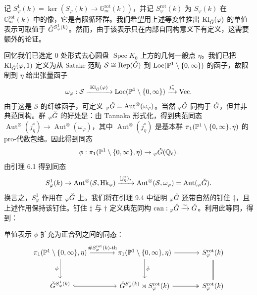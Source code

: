 记 $S^1_\varphi(k)=\ker(S_\varphi(k)\to\mathbb{G}_m^{\mathrm{rot}}(k))$，并记 $S^{\mathrm{rot}}_\varphi(k)$ 为 $S_\varphi(k)$ 在 $\mathbb{G}_m^{\mathrm{rot}}(k)$ 中的像，它是有限循环群。我们希望用上述等变性推出 $\mathrm{Kl}_{\check G}(\varphi)$ 的单值表示可取值于 $\check G^{S^1_\varphi(k)}$。然而，由于该表示只在内部自同构意义下有定义，这需要额外的论证。

回忆我们已选定 $0$ 处形式去心圆盘 $\operatorname{Spec}K_0$ 上方的几何一般点 $\eta$。我们已把 $\mathrm{Kl}_{\check G}(\varphi,1)$ 定义为从 Satake 范畴 $\mathcal S\cong\mathrm{Rep}(\check G)$ 到 $\mathrm{Loc}(\mathbb{P}^1\setminus\{0,\infty\})$ 的函子，故限制到 $\eta$ 给出张量函子
\begin{equation}
\omega_\varphi:\mathcal S\xrightarrow{\ \Kl_{\ckG}(\varphi)\ }\Loc(\PP^1\setminus\{0,\infty\})\xrightarrow{j_\eta^*}\Vec.
\end{equation}
由于这是 $\mathcal S$ 的纤维函子，可定义 ${}_\varphi\check G=\operatorname{Aut}^\otimes(\omega_\varphi)$。当然 ${}_\varphi\check G$ 同构于 $\check G$，但并非典范同构。群 ${}_\varphi\check G$ 的好处是：由 Tannaka 形式化，得到典范同态 $\operatorname{Aut}^\otimes(j_\eta^*)\to\operatorname{Aut}^\otimes(\omega_\varphi)$，其中 $\operatorname{Aut}^\otimes(j_\eta^*)$ 是基本群 $\pi_1(\mathbb{P}^1\setminus\{0,\infty\},\eta)$ 的 pro-代数包络。因此得到同态
\begin{equation}
\phi:\pi_1(\mathbb{P}^1\setminus\{0,\infty\},\eta)\to{}_\varphi\check G(\mathbb{Q}_\ell).
\end{equation}
由引理 6.1 得到同态
\begin{equation}
S^1_\varphi(k)\to\operatorname{Aut}^\otimes(\mathcal S,\mathrm{Hk}_\varphi)\xrightarrow{(j_\eta^*)_*}\operatorname{Aut}^\otimes(\mathcal S,\omega_\varphi)=\operatorname{Aut}({}_\varphi\check G).
\end{equation}
换言之，$S^1_\varphi$ 作用在 ${}_\varphi\check G$ 上。我们将在引理 9.4 中证明 ${}_\varphi\check G$ 还带自然的钉住 $\ddagger$，且上述作用保持该钉住。钉住 $\ddagger$ 与 $\dagger$ 定义典范同构 $\mathrm{can}:{}_\varphi\check G\xrightarrow{\sim}\check G$。利用此等同，得到：

\begin{corollary}
单值表示 $\phi$ 扩充为正合列之间的同态：
\begin{equation}
\begin{tikzcd}[column sep=large, row sep=large]
\pi_1(\PP^1\setminus\{0,\infty\},\eta) \arrow[r, "{\#S^{\mathrm{rot}}_\varphi(k)\text{-}\mathrm{th}}"] \arrow[d, "\phi"'] & \pi_1(\PP^1\setminus\{0,\infty\},\eta) \arrow[r] \arrow[d, "\tilde\phi"] & S^{\mathrm{rot}}_\varphi(k) \arrow[d, equal] \\
\ckG^{S^1_\varphi(k)} \arrow[r, hook] & \ckG^{S^1_\varphi(k)}\rtimes S^{\mathrm{rot}}_\varphi(k) \arrow[r, two heads] & S^{\mathrm{rot}}_\varphi(k)
\end{tikzcd}
\end{equation}
\end{corollary}


